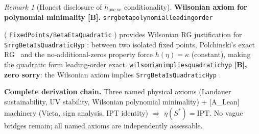 \documentclass[11pt]{article}
\theoremstyle{remark}
\newtheorem{remark}[theorem]{Remark}
\newcommand{\IPT}{\mathrm{IPT}}
\newcommand{\lean}[1]{%
  \penalty-100
  \begingroup
  \def\_{\textunderscore\allowbreak}%
  \texttt{#1}%
  \endgroup
}
\newcommand{\Sstar}{S^*}
\begin{document}
\begin{remark}[Honest disclosure of $h_{\mathrm{psc\_sc}}$ conditionality]
\textbf{Wilsonian axiom for polynomial minimality [B].}
\lean{srrg\_beta\_polynomial\_leading\_order}
(\lean{FixedPoints/BetaEtaQuadratic})
provides Wilsonian RG justification for \lean{SrrgBeta\allowbreak IsQuadraticHyp}:
between two isolated fixed points, Polchinski's exact RG~\cite{Polchinski1984RG}
and the no-additional-zeros property force $h(\eta) = \kappa$ (constant),
making the quadratic form leading-order exact.
\lean{wilsonian\_implies\_quadratic\_hyp} \textbf{[B], zero sorry}:
the Wilsonian axiom implies \lean{SrrgBeta\allowbreak IsQuadraticHyp}.

\textbf{Complete derivation chain.}
Three named physical axioms (Landauer sustainability, UV stability, Wilsonian polynomial
minimality) + [A\_Lean] machinery (Vieta, sign analysis, IPT identity) $\Rightarrow$
$\eta(\Sstar) = \IPT$.  No vague bridges remain; all named axioms are independently assessable.


\end{remark}
\end{document}
